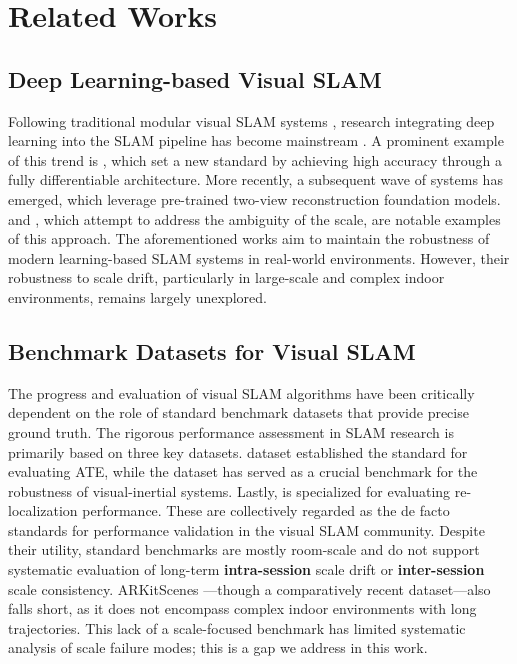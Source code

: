 % 
\section{Related Works}
\label{sec:rel}

% 
\subsection{Deep Learning-based Visual SLAM}
\label{sec:rel1}

Following traditional modular visual SLAM systems \cite{murTRO2015,klein2007parallel}, research integrating deep learning into the SLAM pipeline has become mainstream \cite{favorskaya2023deep,teed2021droid,zhu2022nice}. A prominent example of this trend is  \cite{teed2021droid}, which set a new standard by achieving high accuracy through a fully differentiable architecture. More recently, a subsequent wave of  systems has emerged, which leverage pre-trained two-view reconstruction foundation models.  \cite{murai2025mast3r} and  \cite{maggio2025vggt}, which attempt to address the ambiguity of the scale, are notable examples of this approach. The aforementioned works aim to maintain the robustness of modern learning-based \ac{SLAM} systems in real-world environments. However, their robustness to scale drift, particularly in large-scale and complex indoor environments, remains largely unexplored.

% 
\subsection{Benchmark Datasets for Visual SLAM}
\label{sec:rel2}
The progress and evaluation of visual SLAM algorithms have been critically dependent on the role of standard benchmark datasets that provide precise ground truth. The rigorous performance assessment in SLAM research is primarily based on three key datasets.  dataset \cite{sturm2012benchmark}  established the standard for evaluating \ac{ATE}, while the  dataset \cite{burri2016euroc} has served as a crucial benchmark for the robustness of visual-inertial systems. Lastly,  \cite{glocker2013real} is specialized for evaluating re-localization performance. These are collectively regarded as the de facto standards for performance validation in the visual SLAM community. Despite their utility, standard benchmarks are mostly room-scale and do not support systematic evaluation of long-term \textbf{intra-session} scale drift or \textbf{inter-session} scale consistency. ARKitScenes \cite{dehghan2021arkitscenes}—though a comparatively recent dataset—also falls short, as it does not encompass complex indoor environments with long trajectories. This lack of a scale-focused benchmark has limited systematic analysis of scale failure modes; this is a gap we address in this work.

